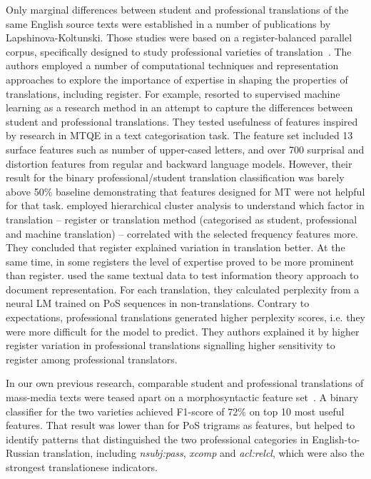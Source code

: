 Only marginal differences between student and professional translations of the same English source texts were established in a number of publications by Lapshinova-Koltunski. Those studies were based on a register-balanced parallel corpus, specifically designed to study professional varieties of translation~\cite{Lapshinova2013}. The authors employed a number of computational techniques and representation approaches to explore the importance of expertise in shaping the properties of translations, including register. 
For example, \citet{Rubino2016} resorted to supervised machine learning as a research method in an attempt to capture the differences between student and professional translations. They tested usefulness of features inspired by research in \gls{MTQE} in a text categorisation task. The feature set included 13 surface features such as number of upper-cased letters, and over 700 surprisal and distortion features from regular and backward language models. However, their result for the binary professional/student translation classification was barely above 50\% baseline demonstrating that features designed for MT were not helpful for that task. 
\citet{Lapshinova2017} employed hierarchical cluster analysis to understand which factor in translation -- register or translation method (categorised as student, professional and machine translation) -- correlated with the selected frequency features more. They concluded that register explained variation in translation better. At the same time, in some registers the level of expertise proved to be more prominent than register. 
\citet{Bizzoni2021} used the same textual data to test information theory approach to document representation. For each translation, they calculated perplexity from a neural LM trained on PoS sequences in non-translations. Contrary to expectations, professional translations generated higher perplexity scores, i.e. they were more difficult for the model to predict. They authors explained it by higher register variation in professional translations signalling higher sensitivity to register among professional translators. 

In our own previous research, comparable student and professional translations of mass-media texts were teased apart on a morphosyntactic feature set~\cite{Kunilovskaya2018ud}. A binary classifier for the two varieties achieved F1-score of 72\% on top 10 most useful features. That result was lower than for PoS trigrams as features, but helped to identify patterns that distinguished the two professional categories in English-to-Russian translation, including \textit{nsubj:pass}, \textit{xcomp} and \textit{acl:relcl}, which were also the strongest translationese indicators.

